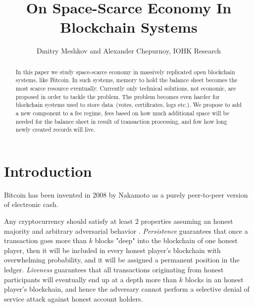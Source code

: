 \documentclass[]{article}   %
\newcommand{\authnote}[2]{\marginpar{\parbox{\marginparwidth}{\tiny %
  \textsf{#1 {\textcolor{blue}{notes: #2}}}}}%
  \textcolor{blue}{\textbf{\dag}}}
\newcommand{\authnote}[2]{
  \textsf{#1 \textcolor{blue}{: #2}}}
\newcommand{\authnote}[2]{}
\newcommand{\dnote}[1]{{\authnote{\textcolor{blue}{Dima notes}}{#1}}}
\begin{document}
\title{On Space-Scarce Economy In Blockchain Systems}
\author{Dmitry Meshkov and Alexander Chepurnoy, IOHK Research}
\maketitle

\begin{abstract}
In this paper we study space-scarce economy in massively replicated open blockchain systems, like Bitcoin. In such systems, memory to hold the balance sheet becomes the most scarce resource eventually. Currently only technical solutions, not economic, are proposed in order to tackle the problem. The problem becomes even harder for blockchain systems used to store data~(votes, certificates, logs etc.). We propose to add a new component to a fee regime, fees based on how much additional space will be needed for the balance sheet in result of transaction processing, and fow how long newly created records will live.    
\end{abstract}

\section{Introduction}

Bitcoin \cite{Nakamoto2008} has been invented in 2008 by Nakamoto as a purely peer-to-peer version of electronic cash. 

\dnote{more words about bitcoin as an economy}

Any cryptocurrency should satisfy at least 2 properties assuming an honest majority and arbitrary adversarial behavior \cite{Garay2015}. \textit{Persistence} guarantees that once a transaction goes more than $k$ blocks "deep" into the blockchain of one honest player, then it will be included in every honest player's blockchain with overwhelming probability, and it will be assigned a permanent position in the ledger. \textit{Liveness} guarantees that all transactions originating from honest participants will eventually end up at a depth more than $k$ blocks in an honest player's blockchain, and hence the adversary cannot perform a selective denial of service attack against honest account holders.
\end{document}
